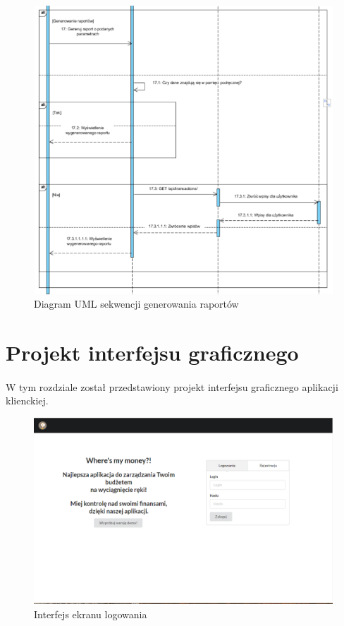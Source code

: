 \documentclass{article}
\begin{document}
	\begin{figure}[H]

		\hspace*{-1.5cm}
		\includegraphics[scale=0.9]{assets/sq8.png}
		\caption[]{Diagram UML sekwencji generowania raportów}
		\label{fig:umlrap}
	\end{figure}

	\section{Projekt interfejsu graficznego}
	\paragraph*{} W tym rozdziale został przedstawiony projekt interfejsu graficznego aplikacji klienckiej.

	\begin{figure}[H]
		\vspace*{-2cm}
		\hspace*{-1cm}
		\includegraphics[scale=0.4]{assets/view1.png}
		\caption[]{Interfejs ekranu logowania}
		\label{fig:logowanie}
	\end{figure}
\end{document}
